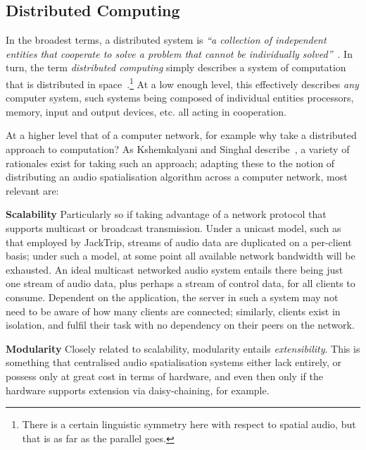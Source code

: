 \subsection{Distributed Computing}\label{subsec:distributed-computing}

In the broadest terms, a distributed system is \textit{``a collection of
independent entities that cooperate to solve a problem that cannot be
individually solved''}~\citep{kshemkalyani_distributed_2011}.
In turn, the term \textit{distributed computing} simply describes a system of
computation that is distributed in
space~\citep{lamport_distributed_1990}.\footnote{
    There is a certain linguistic symmetry here with respect to spatial audio,
    but that is as far as the parallel goes.
}
At a low enough level, this effectively describes \textit{any} computer
system, such systems being composed of individual entities \textemdash{}
processors, memory, input and output devices, etc. \textemdash{} all
acting in cooperation.

At a higher level \textemdash{} that of a computer network, for example
\textemdash{} why take a distributed approach to computation?
As Kshemkalyani and Singhal describe~\citep{kshemkalyani_distributed_2011},
a variety of rationales exist for taking such an approach;
adapting these to the notion of distributing an audio spatialisation algorithm
across a computer network, most relevant are:

\textbf{Scalability}
Particularly so if taking advantage of a network protocol that supports
multicast or broadcast transmission.
Under a unicast model, such as that employed by JackTrip, streams of audio data
are duplicated on a per-client basis;
under such a model, at some point all available network bandwidth will be
exhausted.
An ideal multicast networked audio system entails there being just one stream
of audio data, plus perhaps a stream of control data, for all clients to
consume.
Dependent on the application, the server in such a system may not need to be
aware of how many clients are connected; similarly, clients exist in isolation,
and fulfil their task with no dependency on their peers on the network.

\textbf{Modularity}
Closely related to scalability, modularity entails \textit{extensibility}.
This is something that centralised audio spatialisation systems either lack
entirely, or possess only at great cost in terms of hardware, and even then only
if the hardware supports extension via daisy-chaining, for example.

